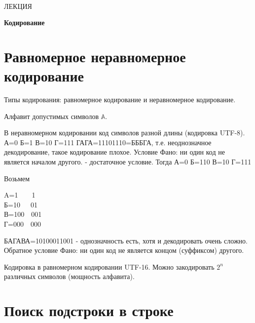 \documentclass[a4paper,12pt]{article}
\theoremstyle{plain} %
\theoremstyle{definition} %
\theoremstyle{remark} %
\begin{document}
\newcommand{\lec}[1]{\addtocounter{lec}{1} \setcounter{section}{0}%
\begin{center}
{\LARGE ЛЕКЦИЯ %
\vspace{2mm}%

\textbf{#1}%
}
\end{center}
}
\newpage
\
\setcounter{lec}{23}
\lec{Кодирование}
\section{Равномерное неравномерное кодирование}
Типы кодирования: равномерное кодирование и неравномерное кодирование.

Алфавит допустимых символов $\mathbb{A}$.

В неравномерном кодировании код символов разной длины (кодировка UTF-8).
А=0
Б=1
В=10
Г=111
ГАГА=11101110=БББГА, т.е. неоднозначное декодирование, такое кодирование плохое.
Условие Фано: ни один код не является началом  другого. - достаточное условие.
Тогда
А=0
Б=110
В=10
Г=111

Возьмем
\begin{center}
A=1\ \ \ \ 1\\
Б=10\ \ \ 01\\
В=100\ \ 001\\
Г=000\ \ 000\\
\end{center}
БАГАВА=10100011001 - однозначность есть, хотя и декодировать очень сложно.
Обратное условие Фано: ни один код не является концом (суффиксом) другого.
 

Кодировка в равномерном кодировании UTF-16. Можно закодировать $2^n$ различных символов (мощность алфавита).

\section{Поиск подстроки в строке}
\end{document}
